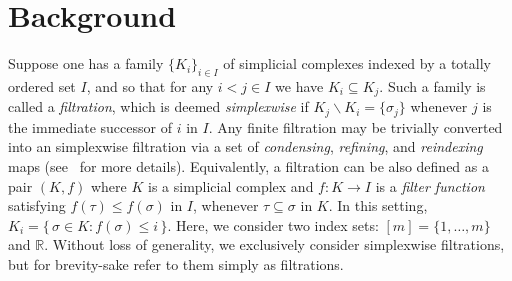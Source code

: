\documentclass[sn-mathphys]{sn-jnl}
\begin{document}
\section{Background}\label{sec:background} 
Suppose one has a family $\{K_i\}_{i\in I}$ of simplicial complexes indexed by a totally ordered   set $I$, and so that for any $i< j \in I$ we have $K_i \subseteq K_j$. 
Such a family is called a \emph{filtration},
which is deemed \emph{simplexwise} if $K_j \smallsetminus K_i = \{\sigma_j\}$ 
whenever $j$ is the immediate successor of $i$ in $I$.
Any finite filtration may be trivially converted into an simplexwise filtration via a set of \emph{condensing}, \emph{refining}, and \emph{reindexing} maps (see~\cite{bauer2021ripser} for more details). 
Equivalently, a filtration can be also defined as a pair $(K, f)$ where $K$ is a simplicial complex and $f : K \to I$ is a \emph{filter function}  satisfying $f(\tau) \leq f(\sigma)$ in $I$, whenever $\tau \subseteq \sigma$ in  $  K$. In this setting, $K_i = \{ \, \sigma \in K :  f(\sigma) \leq i \, \}$. Here, we consider two index sets: $[m] = \{ 1, \dots, m\}$ and $\mathbb{R}$. 
Without loss of generality, we exclusively consider simplexwise filtrations, but for brevity-sake refer to them simply as filtrations. 
\end{document}
